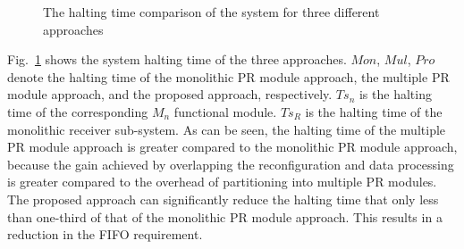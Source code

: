\begin{figure}
\centering
{}
\caption{ The halting time comparison of the system for three different approaches }
\label{fig:Halt}
\end{figure}

Fig.~\ref{fig:Halt} shows the system halting time of the three approaches. $Mon$, $Mul$, $Pro$ denote the halting time of the monolithic PR module approach, the multiple PR module approach, and the proposed approach, respectively.
$Ts_n$ is the halting time of the corresponding $M_n$ functional module. $Ts_R$ is the halting time of the monolithic receiver sub-system. As can be seen, the halting time of the multiple PR module approach is greater compared to the monolithic PR module approach, because the gain achieved by overlapping the reconfiguration and data processing is greater compared to the overhead of partitioning into multiple PR modules. The proposed approach can significantly reduce the halting time that only less than one-third of that of the monolithic PR module approach. This results in a reduction in the FIFO requirement.

